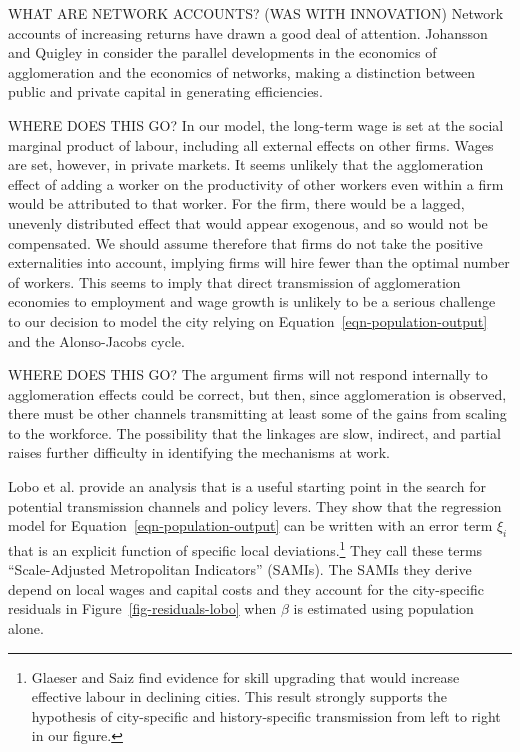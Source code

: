 WHAT ARE NETWORK ACCOUNTS? (WAS WITH INNOVATION) Network accounts of increasing returns have drawn a good deal of attention.
Johansson and Quigley \cite{johanssonAgglomerationNetworksSpatial} in \cite{floraxFiftyYearsRegional2004} consider the parallel developments in the economics of agglomeration and the economics of networks, making a distinction between public and private capital in generating efficiencies.

WHERE DOES THIS GO? In our model, the long-term wage is set at the social marginal product of labour, including all external effects on other firms. Wages are set, however, in private markets. It seems unlikely that the agglomeration effect of adding a worker on the productivity of other workers even within a firm would be attributed to that worker. For the firm, there would be a lagged, unevenly distributed effect that would appear exogenous, and so would not be compensated. 
We should assume therefore that firms do not take the positive externalities into account, implying firms will hire fewer than the optimal number of workers. 
This seems to imply that direct transmission of agglomeration economies to employment and wage growth is unlikely to be a serious challenge to our decision to model the city relying on Equation~\ref{eqn-population-output} and the  Alonso-Jacobs cycle.




WHERE DOES THIS GO? The argument firms will not respond internally to agglomeration effects could be correct, but then, since agglomeration is observed, there must be other channels transmitting at least some of the gains from scaling to the workforce. 
The possibility that the linkages are slow, indirect, and partial raises further difficulty in identifying the mechanisms at work.




Lobo et al. \cite{loboUrbanScalingProduction2013} provide an analysis that is a useful starting point in the search for potential transmission channels and policy levers. They show that the regression model for Equation~\ref{eqn-population-output} can be written with an error term $\xi_i$ that is an explicit function of specific local deviations.\footnote{Glaeser and Saiz \cite{glaeserRiseSkilledCity2003} find %
evidence for skill upgrading that would increase effective labour in declining cities. This result strongly supports the hypothesis of city-specific and history-specific transmission from left to right in our figure.} 
They call these terms ``Scale-Adjusted Metropolitan Indicators'' (SAMIs). The SAMIs they derive depend on local wages and capital costs and they account for the city-specific residuals in Figure~\ref{fig-residuals-lobo} when $\beta$ is estimated using population alone. 
 
